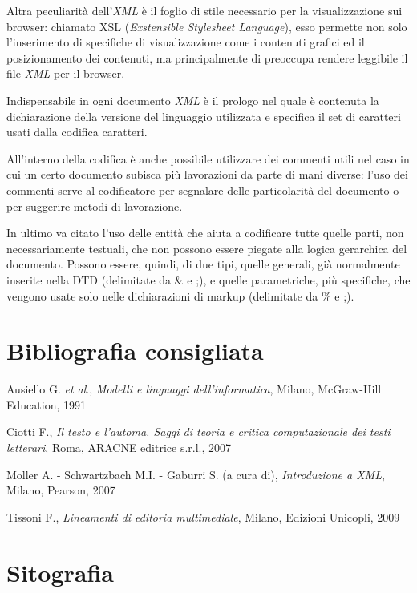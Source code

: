 \documentclass[
  b5paper,
  twoside,
  12pt,
  chapterprefix=false,
  bibliography=totocnumbered,
  parskip=false]{scrbook}
\begin{document}
Altra peculiarità dell'\emph{XML} è il foglio di stile necessario per la
visualizzazione sui browser: chiamato XSL (\emph{Exstensible Stylesheet
Language}), esso permette non solo l'inserimento di specifiche di
visualizzazione come i contenuti grafici ed il posizionamento dei
contenuti, ma principalmente di preoccupa rendere leggibile il file
\emph{XML} per il browser.

Indispensabile in ogni documento \emph{XML} è il prologo nel quale è
contenuta la dichiarazione della versione del linguaggio utilizzata e
specifica il set di caratteri usati dalla codifica caratteri.

All'interno della codifica è anche possibile utilizzare dei commenti
utili nel caso in cui un certo documento subisca più lavorazioni da
parte di mani diverse: l'uso dei commenti serve al codificatore per
segnalare delle particolarità del documento o per suggerire metodi di
lavorazione.

In ultimo va citato l'uso delle entità che aiuta a codificare tutte
quelle parti, non necessariamente testuali, che non possono essere
piegate alla logica gerarchica del documento. Possono essere, quindi, di
due tipi, quelle generali, già normalmente inserite nella DTD
(delimitate da \& e ;), e quelle parametriche, più specifiche, che
vengono usate solo nelle dichiarazioni di markup (delimitate da \% e ;).

\hypertarget{bibliografia-consigliata-28}{%
\section*{Bibliografia consigliata}\label{bibliografia-consigliata-28}}

Ausiello G. \emph{et al}., \emph{Modelli e linguaggi dell'informatica}, Milano,
McGraw-Hill Education, 1991

Ciotti F., \emph{Il testo e l'automa. Saggi di teoria e critica
computazionale dei testi letterari}, Roma, ARACNE editrice s.r.l., 2007

Moller A. - Schwartzbach M.I. - Gaburri S. (a cura di), \emph{Introduzione a
XML}, Milano, Pearson, 2007

Tissoni F., \emph{Lineamenti di editoria multimediale}, Milano, Edizioni
Unicopli, 2009

\hypertarget{sitografia-35}{%
\section*{Sitografia}\label{sitografia-35}}
\end{document}
